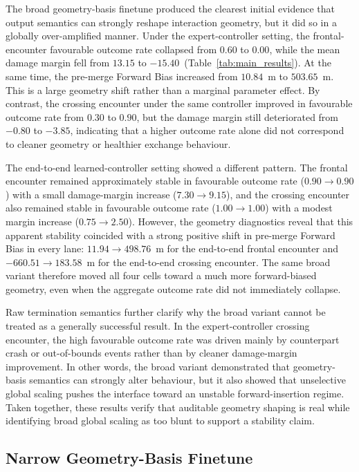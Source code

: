 \documentclass[drones,article,submit,pdftex,moreauthors]{Definitions/mdpi}
\begin{document}
The broad geometry-basis finetune produced the clearest initial evidence that output semantics can strongly reshape interaction geometry, but it did so in a globally over-amplified manner. Under the expert-controller setting, the frontal-encounter favourable outcome rate collapsed from $0.60$ to $0.00$, while the mean damage margin fell from $13.15$ to $-15.40$~(Table~\ref{tab:main_results}). At the same time, the pre-merge Forward Bias increased from $10.84$~m to $503.65$~m. This is a large geometry shift rather than a marginal parameter effect. By contrast, the crossing encounter under the same controller improved in favourable outcome rate from $0.30$ to $0.90$, but the damage margin still deteriorated from $-0.80$ to $-3.85$, indicating that a higher outcome rate alone did not correspond to cleaner geometry or healthier exchange behaviour.

The end-to-end learned-controller setting showed a different pattern. The frontal encounter remained approximately stable in favourable outcome rate ($0.90 \rightarrow 0.90$) with a small damage-margin increase ($7.30 \rightarrow 9.15$), and the crossing encounter also remained stable in favourable outcome rate ($1.00 \rightarrow 1.00$) with a modest margin increase ($0.75 \rightarrow 2.50$). However, the geometry diagnostics reveal that this apparent stability coincided with a strong positive shift in pre-merge Forward Bias in every lane: $11.94 \rightarrow 498.76$~m for the end-to-end frontal encounter and $-660.51 \rightarrow 183.58$~m for the end-to-end crossing encounter. The same broad variant therefore moved all four cells toward a much more forward-biased geometry, even when the aggregate outcome rate did not immediately collapse.

Raw termination semantics further clarify why the broad variant cannot be treated as a generally successful result. In the expert-controller crossing encounter, the high favourable outcome rate was driven mainly by counterpart crash or out-of-bounds events rather than by cleaner damage-margin improvement. In other words, the broad variant demonstrated that geometry-basis semantics can strongly alter behaviour, but it also showed that unselective global scaling pushes the interface toward an unstable forward-insertion regime. Taken together, these results verify that auditable geometry shaping is real while identifying broad global scaling as too blunt to support a stability claim.

\subsection{Narrow Geometry-Basis Finetune}
\end{document}
